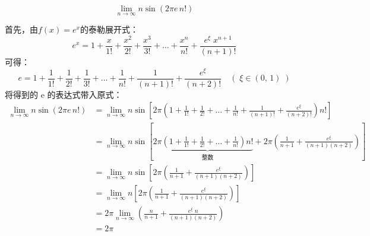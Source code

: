 \documentclass{article}
\begin{document}
\begin{huge}
$$ \lim_{n \to \infty} n \sin{(2 \pi e \, n!)} $$
\end{huge}
首先，由$f(x)=e^x$的泰勒展开式：
$$e^x = 1 +\frac{x}{1!} + \frac{x^2}{2!}+ \frac{x^3}{3!} + \dots + \frac{x^n}{n!} + \frac{e^{\xi} \; x^{n+1}}{(n+1)!}$$
可得：
$$e = 1 + \frac{1}{1!} + \frac{1}{2!} + \frac{1}{3!} + \dots + \frac{1}{n!} + \frac{1}{(n+1)!} + \frac{e^\xi}{(n+2)!}
\quad (\;\xi \in (0,\,1)\;)$$
将得到的 e 的表达式带入原式：
$$
\begin{aligned}
\lim_{n \to \infty} n \sin{(2 \pi e \, n!)}
&= \lim_{n \to \infty} n \sin{\left[
2 \pi \left(1 + \frac{1}{1!} + \frac{1}{2!} + \dots + \frac{1}{n!} + \frac{1}{(n+1)!}+ \frac{e^\xi}{(n+2)!}\right) n!
\right]}  \\
&= \lim_{n \to \infty} n \sin{\left[
2 \pi \underbrace{\left(1 + \frac{1}{1!} + \frac{1}{2!} + \dots + \frac{1}{n!}\right) n!}_{\text{整数}}
 + 2 \pi \left(\frac{1}{n+1} + \frac{e^\xi}{(n+1)(n+2)}\right)
\right]} \\
&= \lim_{n \to \infty} n \sin{\left[
2 \pi \left(\frac{1}{n+1} + \frac{e^\xi}{(n+1)(n+2)}\right)
\right]} \\
&= \lim_{n \to \infty} n \left[2\pi \left(\frac{1}{n+1} + \frac{e^\xi}{(n+1)(n+2)}\right)\right] \\
&= 2\pi \lim_{n \to \infty} \left(\frac{n}{n+1} + \frac{e^\xi \; n}{(n+1)(n+2)}\right) \\
&= 2\pi
\end{aligned}
$$
\end{document}
